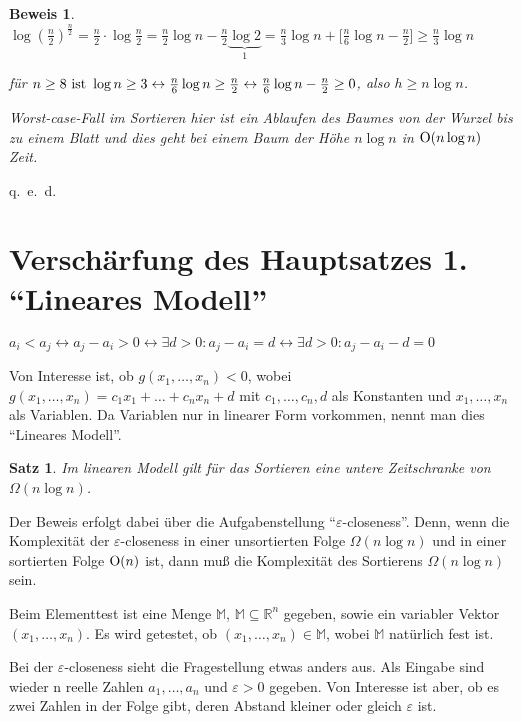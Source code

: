 \documentclass[ngerman,draft,parskip=half*,twoside]{scrreprt}
\theoremstyle{break}
\newtheorem{beweis}{Beweis}
\newtheorem{satz}{Satz}
\begin{document}
\begin{beweis}
\(\log \left(\frac{n}{2}\right)^{\frac{n}{2}} = \frac{n}{2} \cdot \log \frac{n}{2} = \frac{n}{2} \log n - \frac{n}{2}
\underbrace{\log 2}_{1} = \frac{n}{3} \log n + \lbrack \frac{n}{6} \log n - \frac{n}{2} \rbrack \geq \frac {n}{3} \log n \) 

für \( n \geq 8\ \textup{ist}\ \log n \geq 3 \leftrightarrow \frac{n}{6} \log n \geq \frac {n}{2} 
\leftrightarrow \frac{n}{6} \log n - \frac{n}{2} \geq 0\), also \(h \geq n \log n\).

Worst-case-Fall im Sortieren hier ist ein Ablaufen des Baumes von der Wurzel bis zu einem Blatt und dies geht bei einem Baum der Höhe \(n
\log n\) in \(\textup{O}(n \log n)\) Zeit.
\end{beweis}
\hfill q.~e.~d. 

\section{Verschärfung des Hauptsatzes 1. "`Lineares Modell"'}

\( a_i < a_j \leftrightarrow a_j - a_i > 0
\leftrightarrow \exists  d > 0 : a_j - a_i = d
\leftrightarrow \exists   d > 0 : a_j - a_i - d = 0 \) 
\bigskip

Von Interesse ist, ob \( g(x_1 , \dots , x_n) < 0 \), wobei \( g(x_1 , \dots , x_n) = c_1 x_1 + \dots + c_n x_n + d \) mit
\( c_1, \dots , c_n, d \) als Konstanten und \( x_1, \dots, x_n  \) als Variablen.
Da Variablen nur in linearer Form vorkommen, nennt man dies "`Lineares Modell"'.

\begin{satz}
Im linearen Modell gilt für das Sortieren eine untere Zeitschranke von \( \Omega (n \log n) \).
\end{satz}
		
Der Beweis erfolgt dabei über die Aufgabenstellung "`$\varepsilon$-closeness"'. Denn, wenn die Komplexität der $\varepsilon$-closeness
in einer unsortierten Folge \( \Omega (n \log n) \) und in einer sortierten Folge \( \textup{O}(n)\) ist, dann muß die Komplexität des
Sortierens \( \Omega (n \log n)\) sein.
		
Beim Elementtest ist eine Menge \( \mathbb{M} \), \( \mathbb{M} \subseteq \mathbb{R}^n\) gegeben, sowie ein variabler Vektor \(
(x_1, \dots , x_n) \). Es wird getestet, ob \( (x_1, \dots , x_n) \in \mathbb{M} \), wobei \( \mathbb{M} \) natürlich fest ist. 
	
Bei der $\varepsilon$-closeness sieht die Fragestellung etwas anders aus. Als Eingabe sind wieder n reelle Zahlen \(a_1, \dots , a_n \)
und \( \varepsilon > 0 \) gegeben. Von Interesse ist aber, ob es zwei Zahlen in der Folge gibt, deren Abstand kleiner oder gleich
$\varepsilon$ ist.
\end{document}
